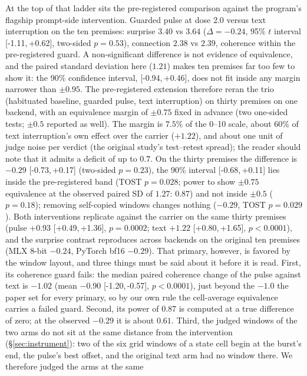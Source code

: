 \documentclass[11pt]{article}
\newcommand{\ci}[2]{[#1,\,#2]}
\begin{document}
At the top of that ladder sits the pre-registered comparison against
the program's flagship prompt-side intervention. Guarded pulse at
dose 2.0 versus text interruption on the ten premises: surprise $3.40$
vs $3.64$ ($\Delta = -0.24$, 95\% $t$ interval \ci{-1.11}{+0.62},
two-sided $p=0.53$),
connection $2.38$ vs $2.39$, coherence within the pre-registered
guard. A non-significant difference is not evidence of equivalence,
and the paired standard deviation here ($1.21$) makes ten premises far
too few to show it: the 90\% confidence interval, \ci{-0.94}{+0.46},
does not fit inside any margin narrower than $\pm 0.95$. The
pre-registered extension therefore reran the trio (habituated
baseline, guarded pulse, text interruption) on thirty premises on
one backend, with an equivalence margin of $\pm 0.75$ fixed in advance
(two one-sided tests; $\pm 0.5$ reported as well). The margin is
$7.5\%$ of the 0--10 scale, about 60\% of text interruption's own effect
over the carrier ($+1.22$), and about one unit of judge noise per
verdict (the original study's test--retest spread); the reader should
note that it admits a deficit of up to $0.7$. On the thirty
premises the difference is $-0.29$ \ci{-0.73}{+0.17} (two-sided
$p=0.23$), the 90\% interval \ci{-0.68}{+0.11} lies inside the
pre-registered band (TOST $p=0.028$; power to show $\pm0.75$
equivalence at the observed paired SD of $1.27$: $0.87$) and not inside
$\pm0.5$ ($p=0.18$); removing self-copied windows changes nothing
($-0.29$, TOST $p=0.029$). Both interventions replicate against the
carrier on the same thirty premises (pulse $+0.93$ \ci{+0.49}{+1.36},
$p=0.0002$; text $+1.22$ \ci{+0.80}{+1.65}, $p<0.0001$), and the
surprise contrast reproduces across backends on the original ten
premises (MLX 8-bit $-0.24$, PyTorch bf16 $-0.29$). That primary, however, is favored by the window layout, and three
things must be said about it before it is read. First, its coherence
guard fails: the median paired coherence change of the pulse against
text is $-1.02$ (mean $-0.90$ \ci{-1.20}{-0.57}, $p<0.0001$), just
beyond the $-1.0$ the paper set for every primary, so by our own rule
the cell-average equivalence carries a failed guard. Second, its power
of $0.87$ is computed at a true difference of zero; at the observed
$-0.29$ it is about $0.61$. Third, the judged windows of the two
arms do not sit at the same distance from the intervention
(\S\ref{sec:instrument}): two of the six grid windows of a state cell
begin at the burst's end, the pulse's best offset, and the original
text arm had no window there. We therefore judged the arms at the same
\end{document}
